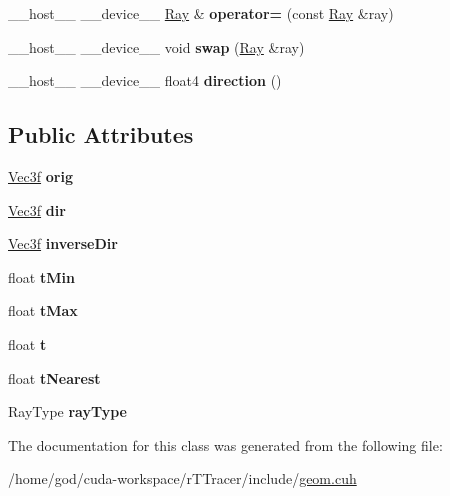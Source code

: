\begin{DoxyCompactItemize}
\item 
\+\_\+\+\_\+host\+\_\+\+\_\+ \+\_\+\+\_\+device\+\_\+\+\_\+ \hyperlink{class_ray}{Ray} \& {\bfseries operator=} (const \hyperlink{class_ray}{Ray} \&ray)\hypertarget{class_ray_ae5f0c2eebb56ef7f3e4d43a49bfc94a7}{}\label{class_ray_ae5f0c2eebb56ef7f3e4d43a49bfc94a7}

\item 
\+\_\+\+\_\+host\+\_\+\+\_\+ \+\_\+\+\_\+device\+\_\+\+\_\+ void {\bfseries swap} (\hyperlink{class_ray}{Ray} \&ray)\hypertarget{class_ray_ac55e80131f5422dd969190ebb56a4be7}{}\label{class_ray_ac55e80131f5422dd969190ebb56a4be7}

\item 
\+\_\+\+\_\+host\+\_\+\+\_\+ \+\_\+\+\_\+device\+\_\+\+\_\+ float4 {\bfseries direction} ()\hypertarget{class_ray_afa09f7613e0f5e5e7e0d1093ea83df6b}{}\label{class_ray_afa09f7613e0f5e5e7e0d1093ea83df6b}

\end{DoxyCompactItemize}
\subsection*{Public Attributes}
\begin{DoxyCompactItemize}
\item 
\hyperlink{class_vec3}{Vec3f} {\bfseries orig}\hypertarget{class_ray_a83060ce4752b7178322491c3ba060aeb}{}\label{class_ray_a83060ce4752b7178322491c3ba060aeb}

\item 
\hyperlink{class_vec3}{Vec3f} {\bfseries dir}\hypertarget{class_ray_abb6aec8e6d0ce79e31ccaf7cc0bd2f5e}{}\label{class_ray_abb6aec8e6d0ce79e31ccaf7cc0bd2f5e}

\item 
\hyperlink{class_vec3}{Vec3f} {\bfseries inverse\+Dir}\hypertarget{class_ray_a4aeb023e811e12834cb8e1daaf1e3db4}{}\label{class_ray_a4aeb023e811e12834cb8e1daaf1e3db4}

\item 
float {\bfseries t\+Min}\hypertarget{class_ray_a79bb8e0202bc33a3035b59b0cc25716d}{}\label{class_ray_a79bb8e0202bc33a3035b59b0cc25716d}

\item 
float {\bfseries t\+Max}\hypertarget{class_ray_a02e897e4b9c32cf86b7a28b44655b991}{}\label{class_ray_a02e897e4b9c32cf86b7a28b44655b991}

\item 
float {\bfseries t}\hypertarget{class_ray_a4ec5a9098b620bda59d15b0a4f99d454}{}\label{class_ray_a4ec5a9098b620bda59d15b0a4f99d454}

\item 
float {\bfseries t\+Nearest}\hypertarget{class_ray_ac729496eee350d328c4bff50b8235baf}{}\label{class_ray_ac729496eee350d328c4bff50b8235baf}

\item 
Ray\+Type {\bfseries ray\+Type}\hypertarget{class_ray_a53798941244349eeb1b61d9a3cef8425}{}\label{class_ray_a53798941244349eeb1b61d9a3cef8425}

\end{DoxyCompactItemize}


The documentation for this class was generated from the following file\+:\begin{DoxyCompactItemize}
\item 
/home/god/cuda-\/workspace/r\+T\+Tracer/include/\hyperlink{r_t_tracer_2include_2geom_8cuh}{geom.\+cuh}\end{DoxyCompactItemize}
